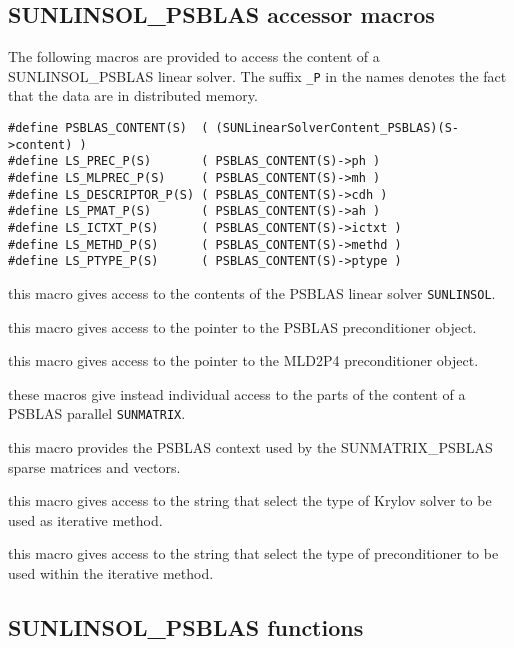 \documentclass[twoside,a4paper]{refart}
\theoremstyle{definition}
\begin{document}
\subsection{SUNLINSOL\_PSBLAS accessor macros}

The following macros are provided to access the content of a SUNLINSOL\_PSBLAS linear solver. The suffix \texttt{\_P} in the names denotes the fact that the data are in distributed memory.

\begin{lstlisting}[style=CStyle]
#define PSBLAS_CONTENT(S)  ( (SUNLinearSolverContent_PSBLAS)(S->content) )
#define LS_PREC_P(S)       ( PSBLAS_CONTENT(S)->ph )
#define LS_MLPREC_P(S)     ( PSBLAS_CONTENT(S)->mh )
#define LS_DESCRIPTOR_P(S) ( PSBLAS_CONTENT(S)->cdh )
#define LS_PMAT_P(S)       ( PSBLAS_CONTENT(S)->ah )
#define LS_ICTXT_P(S)      ( PSBLAS_CONTENT(S)->ictxt )
#define LS_METHD_P(S)      ( PSBLAS_CONTENT(S)->methd )
#define LS_PTYPE_P(S)      ( PSBLAS_CONTENT(S)->ptype )
\end{lstlisting}

 this macro gives access to the contents of the PSBLAS linear solver \texttt{SUNLINSOL}.
	
 this macro gives access to the pointer to the PSBLAS preconditioner object.

 this macro gives access to the pointer to the MLD2P4 preconditioner object.

 these macros give instead individual access to the parts of the content of a PSBLAS parallel \texttt{SUNMATRIX}.

 this macro provides the PSBLAS context used by the SUNMATRIX\_PSBLAS sparse matrices and vectors.

 this macro gives access to the string that select the type of Krylov solver to be used as iterative method.

 this macro gives access to the string that select the type of preconditioner to be used within the iterative method.

\subsection{SUNLINSOL\_PSBLAS functions}
\end{document}

